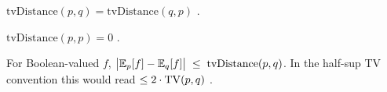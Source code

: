 \begin{thm}
\label{thm:tv-distance-comm}
  \leanok
$\mathrm{tvDistance}(p, q) = \mathrm{tvDistance}(q, p)$
\cite[\S4.1]{boucheron2013concentration}.
\end{thm}

\begin{thm}
\label{thm:tv-distance-self}
  \leanok
$\mathrm{tvDistance}(p, p) = 0$
\cite[\S4.1]{boucheron2013concentration}.
\end{thm}

\begin{thm}
\label{thm:tv-transfer}
  \leanok
For Boolean-valued $f$,
$\bigl| \mathbb{E}_p[f] - \mathbb{E}_q[f] \bigr| \;\le\; \mathrm{tvDistance}(p, q)$.
In the half-sup TV convention this would read $\le 2 \cdot \mathrm{TV}(p, q)$
\cite[\S4.1]{boucheron2013concentration}.
\end{thm}
